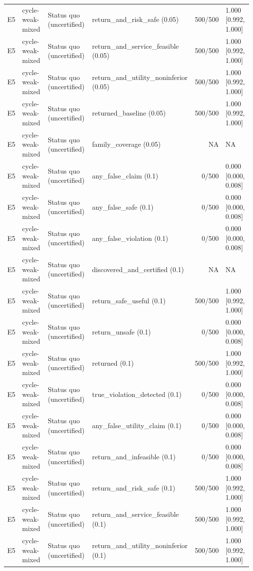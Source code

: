 \begin{longtable}{p{.04\linewidth}p{.18\linewidth}p{.19\linewidth}p{.16\linewidth}r p{.21\linewidth}}
E5 & cycle-weak-mixed & Status quo (uncertified) & return\_and\_risk\_safe (0.05) & 500/500 & 1.000 [0.992, 1.000]\\
E5 & cycle-weak-mixed & Status quo (uncertified) & return\_and\_service\_feasible (0.05) & 500/500 & 1.000 [0.992, 1.000]\\
E5 & cycle-weak-mixed & Status quo (uncertified) & return\_and\_utility\_noninferior (0.05) & 500/500 & 1.000 [0.992, 1.000]\\
E5 & cycle-weak-mixed & Status quo (uncertified) & returned\_baseline (0.05) & 500/500 & 1.000 [0.992, 1.000]\\
E5 & cycle-weak-mixed & Status quo (uncertified) & family\_coverage (0.05) & NA & NA\\
E5 & cycle-weak-mixed & Status quo (uncertified) & any\_false\_claim (0.1) & 0/500 & 0.000 [0.000, 0.008]\\
E5 & cycle-weak-mixed & Status quo (uncertified) & any\_false\_safe (0.1) & 0/500 & 0.000 [0.000, 0.008]\\
E5 & cycle-weak-mixed & Status quo (uncertified) & any\_false\_violation (0.1) & 0/500 & 0.000 [0.000, 0.008]\\
E5 & cycle-weak-mixed & Status quo (uncertified) & discovered\_and\_certified (0.1) & NA & NA\\
E5 & cycle-weak-mixed & Status quo (uncertified) & return\_safe\_useful (0.1) & 500/500 & 1.000 [0.992, 1.000]\\
E5 & cycle-weak-mixed & Status quo (uncertified) & return\_unsafe (0.1) & 0/500 & 0.000 [0.000, 0.008]\\
E5 & cycle-weak-mixed & Status quo (uncertified) & returned (0.1) & 500/500 & 1.000 [0.992, 1.000]\\
E5 & cycle-weak-mixed & Status quo (uncertified) & true\_violation\_detected (0.1) & 0/500 & 0.000 [0.000, 0.008]\\
E5 & cycle-weak-mixed & Status quo (uncertified) & any\_false\_utility\_claim (0.1) & 0/500 & 0.000 [0.000, 0.008]\\
E5 & cycle-weak-mixed & Status quo (uncertified) & return\_and\_infeasible (0.1) & 0/500 & 0.000 [0.000, 0.008]\\
E5 & cycle-weak-mixed & Status quo (uncertified) & return\_and\_risk\_safe (0.1) & 500/500 & 1.000 [0.992, 1.000]\\
E5 & cycle-weak-mixed & Status quo (uncertified) & return\_and\_service\_feasible (0.1) & 500/500 & 1.000 [0.992, 1.000]\\
E5 & cycle-weak-mixed & Status quo (uncertified) & return\_and\_utility\_noninferior (0.1) & 500/500 & 1.000 [0.992, 1.000]\\

\end{longtable}
